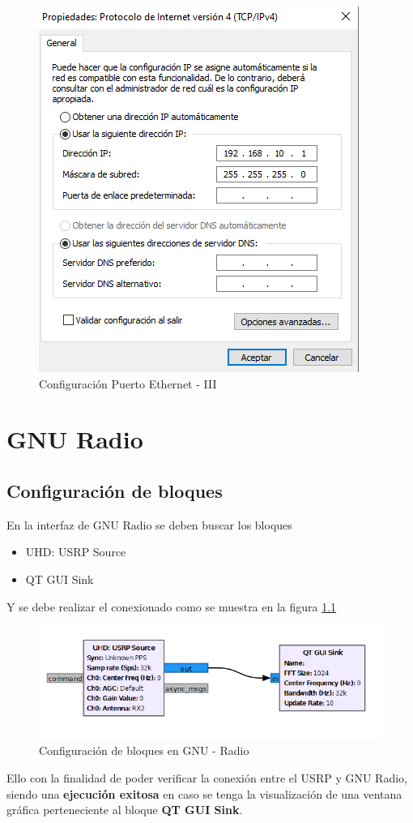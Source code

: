 \documentclass[12pt]{report}
\begin{document}
	\begin{figure}[h]
		\centering
		\includegraphics[width=0.5\linewidth]{media/conexion-ethernet3}
		\caption{Configuración Puerto Ethernet - III}
		\label{fig:conexion-ethernet3}
	\end{figure}
	
	\chapter{GNU Radio}
	
	\section{Configuración de bloques}
	En la interfaz de GNU Radio se deben buscar los bloques
	
	\begin{itemize}
		\item UHD: USRP Source
		\item QT GUI Sink
	\end{itemize}
	
	Y se debe realizar el conexionado como se muestra en la figura \ref{fig:gnu-radio-bloques} 
	
	\begin{figure}[h]
		\centering
		\includegraphics[width=0.6\linewidth]{media/gnu-radio-bloques}
		\caption{Configuración de bloques en GNU - Radio}
		\label{fig:gnu-radio-bloques}
	\end{figure}
	
	Ello con la finalidad de poder verificar la conexión entre  el USRP y GNU Radio, siendo una \textbf{ejecución exitosa} en caso se tenga la visualización de una ventana gráfica perteneciente al bloque \textbf{QT GUI Sink}.
	
\end{document}
